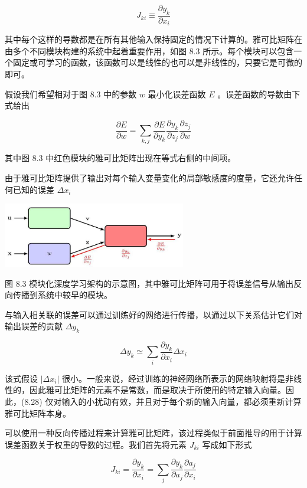 \documentclass[10pt]{article}
\begin{document}
\[
{J}_{ki} \equiv  \frac{\partial {y}_{k}}{\partial {x}_{i}} \tag{8.26}
\]

其中每个这样的导数都是在所有其他输入保持固定的情况下计算的。雅可比矩阵在由多个不同模块构建的系统中起着重要作用，如图 8.3 所示。每个模块可以包含一个固定或可学习的函数，该函数可以是线性的也可以是非线性的，只要它是可微的即可。

假设我们希望相对于图 8.3 中的参数 \(w\) 最小化误差函数 \(E\) 。误差函数的导数由下式给出

\[
\frac{\partial E}{\partial w} = \mathop{\sum }\limits_{{k,j}}\frac{\partial E}{\partial {y}_{k}}\frac{\partial {y}_{k}}{\partial {z}_{j}}\frac{\partial {z}_{j}}{\partial w} \tag{8.27}
\]

其中图 8.3 中红色模块的雅可比矩阵出现在等式右侧的中间项。

由于雅可比矩阵提供了输出对每个输入变量变化的局部敏感度的度量，它还允许任何已知的误差 \(\Delta {x}_{i}\)

\begin{center}
\includegraphics[max width=0.6\textwidth]{images/0194e279-9b28-703a-88f4-c3ac21e2010d_260_730_340_812_287_0.jpg}
\end{center}
\hspace*{3em} 

图 8.3 模块化深度学习架构的示意图，其中雅可比矩阵可用于将误差信号从输出反向传播到系统中较早的模块。

与输入相关联的误差可以通过训练好的网络进行传播，以通过以下关系估计它们对输出误差的贡献 \(\Delta {y}_{k}\)

\[
\Delta {y}_{k} \simeq  \mathop{\sum }\limits_{i}\frac{\partial {y}_{k}}{\partial {x}_{i}}\Delta {x}_{i} \tag{8.28}
\]

该式假设 \(\left| {\Delta {x}_{i}}\right|\) 很小。一般来说，经过训练的神经网络所表示的网络映射将是非线性的，因此雅可比矩阵的元素不是常数，而是取决于所使用的特定输入向量。因此，(8.28) 仅对输入的小扰动有效，并且对于每个新的输入向量，都必须重新计算雅可比矩阵本身。

可以使用一种反向传播过程来计算雅可比矩阵，该过程类似于前面推导的用于计算误差函数关于权重的导数的过程。我们首先将元素 \({J}_{ki}\) 写成如下形式

\[
{J}_{ki} = \frac{\partial {y}_{k}}{\partial {x}_{i}} = \mathop{\sum }\limits_{j}\frac{\partial {y}_{k}}{\partial {a}_{j}}\frac{\partial {a}_{j}}{\partial {x}_{i}}
\]
\end{document}
